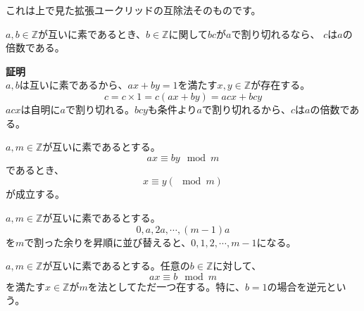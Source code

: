 \documentclass{jlreq}
\begin{document}
これは上で見た拡張ユークリッドの互除法そのものです。

\begin{theorembox}
    $a, b \in \mathbb{Z}$が互いに素であるとき、$b \in \mathbb{Z}$に関して$bc$が$a$で割り切れるなら、
    $c$は$a$の倍数である。

    \textbf{証明}  \\
    $a, b$は互いに素であるから、$ax + by = 1$を満たす$x, y \in \mathbb{Z}$が存在する。
    \begin{equation*}
        c = c \times 1 = c (ax + by) = acx + bcy
    \end{equation*}
    $acx$は自明に$a$で割り切れる。$bcy$も条件より$a$で割り切れるから、$c$は$a$の倍数である。

\end{theorembox}

\begin{theorembox}[合同式の割り算]
    $a, m \in \mathbb{Z}$が互いに素であるとする。
    \begin{equation*}
        ax \equiv by \mod{m}
    \end{equation*}
    であるとき、
    \begin{equation*}
        x\equiv y (\mod{m})
    \end{equation*}
    が成立する。
\end{theorembox}

\begin{theorembox}[倍数の周期性]
    $a, m \in \mathbb{Z}$が互いに素であるとする。
    \begin{equation*}
        0, a, 2a, \cdots, (m - 1)a
    \end{equation*}
    を$m$で割った余りを昇順に並び替えると、$0, 1, 2, \cdots, m - 1$になる。
\end{theorembox}

\begin{theorembox}[逆元と合同方程式]
    $a, m \in \mathbb{Z}$が互いに素であるとする。任意の$b \in \mathbb{Z}$に対して、
    \begin{equation*}
        a x \equiv b \mod{m}
    \end{equation*}
    を満たす$x \in \mathbb{Z}$が$m$を法としてただ一つ在する。特に、$b = 1$の場合を逆元という。
\end{theorembox}
\end{document}
